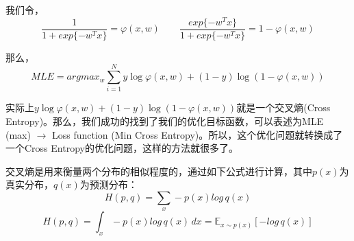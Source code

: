 \documentclass[a4paper]{article}
\begin{document}
我们令，
\begin{equation}
    \frac{1}{1+exp\{-w^Tx\}}=\varphi(x,w) \qquad \frac{exp\{-w^Tx\}}{1+exp\{-w^Tx\}}=1-\varphi(x,w)
\end{equation}

那么，
\begin{equation}
    MLE =  argmax_w \sum_{i=1}^N y\log \varphi(x,w) + (1-y)\log (1-\varphi(x,w))
\end{equation}

实际上$y\log \varphi(x,w) + (1-y)\log (1-\varphi(x,w))$就是一个交叉熵(Cross Entropy)。那么，我们成功的找到了我们的优化目标函数，可以表述为MLE (max) $\longrightarrow$ Loss function (Min Cross Entropy)。所以，这个优化问题就转换成了一个Cross Entropy的优化问题，这样的方法就很多了。

交叉熵是用来衡量两个分布的相似程度的，通过如下公式进行计算，其中$p(x)$为真实分布，$q(x)$为预测分布：
\begin{equation}
    H(p,q)=\sum_{x}-p(x)log \, q(x)
\end{equation}
\begin{equation}
    H(p,q)=\int_{x}-p(x)log\, q(x)\, dx=\mathbb{E}_{x\sim p(x)}[-log\, q(x)]
\end{equation}
\end{document}
